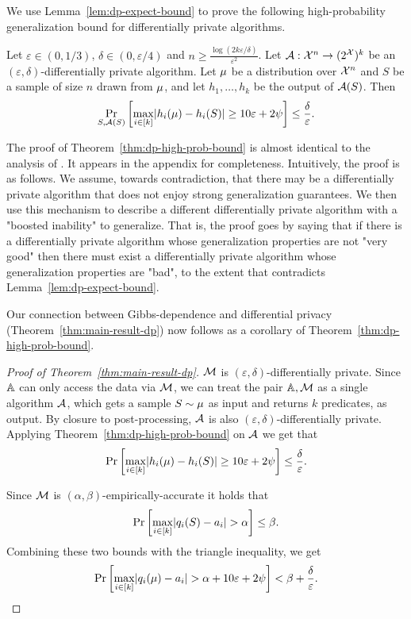 \documentclass[12pt,a4paper,oneside,onecolumn]{book}
\begin{document}
We use Lemma~\ref{lem:dp-expect-bound} to prove the following high-probability generalization bound for differentially private algorithms. 

\begin{theorem}
  \label{thm:dp-high-prob-bound}
  Let $\varepsilon\in (0,1/3)$, $\delta \in (0,\varepsilon/4)$
  and $n \geq \frac{\log(2k\varepsilon/\delta)}{\varepsilon^2}$.
  Let $\mathcal{A}:\mathcal{X}^n \to (2^{\mathcal{X}})^k$ be an $(\varepsilon,\delta)$-differentially private algorithm.
  Let $\mu$ be a distribution over $\mathcal{X}^n$
  and
$S$ be a sample of size $n$
  drawn from $\mu$,
  and let $h_1,\ldots,h_k$ be the output of $\mathcal{A}(S)$.
  Then
  \begin{equation*}
    \Pr_{S,\mathcal{A}(S)}\left[\max_{i\in [k]}\lvert h_i(\mu)-h_i(S)\rvert\geq 10\varepsilon+2\psi\right]\leq \frac{\delta}{\varepsilon}      .
  \end{equation*}
\end{theorem}


The proof of Theorem~\ref{thm:dp-high-prob-bound} is almost identical to the analysis of \citet{bassily2016algorithmic}. It appears in the appendix for completeness. Intuitively, the proof is as follows.
We assume, towards contradiction, that there may be a differentially private algorithm that does not enjoy strong generalization guarantees.
We then use this mechanism to describe a different differentially private algorithm with a "boosted  inability" to generalize. That is, the proof goes by saying that if there is a differentially private algorithm whose generalization properties are not "very good" then there must exist a differentially private algorithm whose generalization properties are "bad", to the extent that contradicts Lemma~\ref{lem:dp-expect-bound}. 



\medskip
Our connection between Gibbs-dependence and differential privacy (Theorem~\ref{thm:main-result-dp}) now follows as a corollary of  Theorem~\ref{thm:dp-high-prob-bound}.

\begin{proof}[Proof of Theorem~\ref{thm:main-result-dp}]
  $\mathcal{M}$ is $(\varepsilon,\delta)$-differentially private.
  Since $\mathbb{A}$ can only access the data via $\mathcal{M}$,
  we can treat the pair $\mathbb{A},\mathcal{M}$ as a single algorithm $\mathcal{A}$, which gets a sample $S\sim\mu$ as input and returns $k$ predicates, as output.
  By closure to post-processing, $\mathcal{A}$
  is also $(\varepsilon,\delta)$-differentially private.
  Applying Theorem~\ref{thm:dp-high-prob-bound} on $\mathcal{A}$ we get that
  \[
    \Pr\left[
      \max_{i\in [k]}\lvert h_i(\mu)-h_i(S)\rvert
      \geq 10\varepsilon+2\psi
    \right]
    \leq \frac{\delta}{\varepsilon}.
  \]
  
  Since $\mathcal{M}$ is $(\alpha,\beta)$-empirically-accurate
  it holds that
  \[
    \Pr\left[
      \max_{i\in [k]} \lvert q_i(S) - a_i\rvert > \alpha
    \right] \leq \beta.
  \]
Combining these two bounds with the triangle inequality, we get
  \[
    \Pr\left[
      \max_{i\in [k]} \lvert q_i(\mu) - a_i\rvert
      > \alpha + 10\varepsilon+2\psi
    \right]
    < \beta + \frac{\delta}{\varepsilon}. 
  \]
\end{proof}
\end{document}
